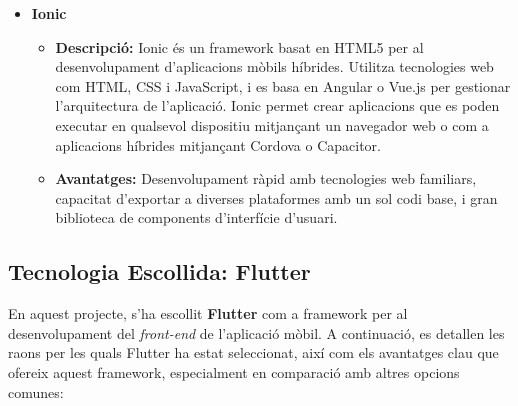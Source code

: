 \documentclass[a4paper,12pt,twoside]{ThesisStyle}
\begin{document}
\begin{itemize}
    \item \textbf{Ionic}
    \begin{itemize}
        \item \textbf{Descripció:} Ionic és un framework basat en HTML5 per al desenvolupament d'aplicacions mòbils híbrides. Utilitza tecnologies web com HTML, CSS i JavaScript, i es basa en Angular o Vue.js per gestionar l'arquitectura de l'aplicació. Ionic permet crear aplicacions que es poden executar en qualsevol dispositiu mitjançant un navegador web o com a aplicacions híbrides mitjançant Cordova o Capacitor.
        \item \textbf{Avantatges:} Desenvolupament ràpid amb tecnologies web familiars, capacitat d'exportar a diverses plataformes amb un sol codi base, i gran biblioteca de components d'interfície d'usuari.
    \end{itemize}
    
\end{itemize}

\subsection{Tecnologia Escollida: Flutter}
\label{subsec: Tecnologia Escollida: Flutter}

En aquest projecte, s'ha escollit \textbf{Flutter} com a framework per al desenvolupament del \textit{front-end} de l'aplicació mòbil. A continuació, es detallen les raons per les quals Flutter ha estat seleccionat, així com els avantatges clau que ofereix aquest framework, especialment en comparació amb altres opcions comunes:
\end{document}
